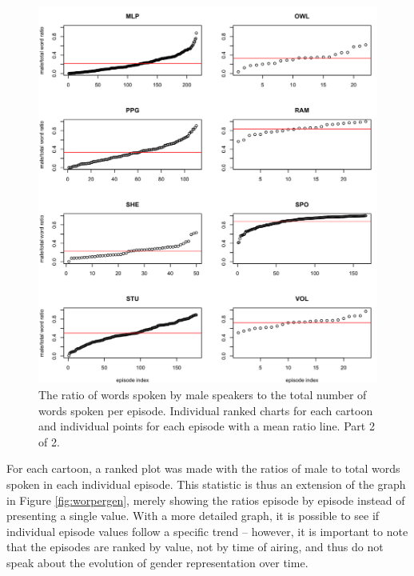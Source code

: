 \documentclass[a4paper, 11pt]{article}
\begin{document}
\begin{figure}[t!]
  \includegraphics[width=\linewidth]{figures/variance2.png}
  \caption{The ratio of words spoken by male speakers to the total number of words spoken per episode. Individual ranked charts for each cartoon and individual points for each episode with a mean ratio line. Part 2 of 2.}
  \label{fig:variance2}
\end{figure}

For each cartoon, a ranked plot was made with the ratios of male to total words spoken in each individual episode. This statistic is thus an extension of the graph in Figure \ref{fig:worpergen}, merely showing the ratios episode by episode instead of presenting a single value. With a more detailed graph, it is possible to see if individual episode values follow a specific trend -- however, it is important to note that the episodes are ranked by value, not by time of airing, and thus do not speak about the evolution of gender representation over time.
\end{document}
